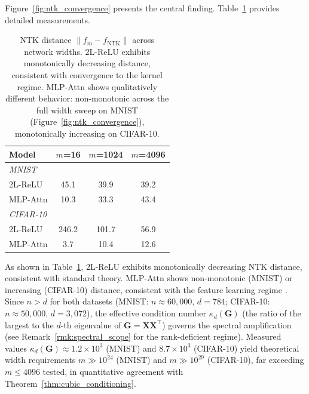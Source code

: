 \documentclass{article}
\theoremstyle{plain}
\theoremstyle{definition}
\theoremstyle{remark}
\begin{document}
Figure~\ref{fig:ntk_convergence} presents the central finding. Table~\ref{tab:ntk_distance} provides detailed measurements.

\begin{table}[t]
\caption{NTK distance $\|f_m - f_{\text{NTK}}\|$ across network widths. 2L-ReLU exhibits monotonically decreasing distance, consistent with convergence to the kernel regime. MLP-Attn shows qualitatively different behavior: non-monotonic across the full width sweep on MNIST (Figure~\ref{fig:ntk_convergence}), monotonically increasing on CIFAR-10.}
\label{tab:ntk_distance}
\vskip 0.1in
\begin{center}
\begin{small}
\begin{tabular}{lccc}
\toprule
\textbf{Model} & \textbf{$m$=16} & \textbf{$m$=1024} & \textbf{$m$=4096} \\
\midrule
\multicolumn{4}{l}{\textit{MNIST}} \\
2L-ReLU & 45.1 & 39.9 & 39.2 \\
MLP-Attn & 10.3 & 33.3 & 43.4 \\
\midrule
\multicolumn{4}{l}{\textit{CIFAR-10}} \\
2L-ReLU & 246.2 & 101.7 & 56.9 \\
MLP-Attn & 3.7 & 10.4 & 12.6 \\
\bottomrule
\end{tabular}
\end{small}
\end{center}
\vskip -0.1in
\end{table}

As shown in Table~\ref{tab:ntk_distance}, 2L-ReLU exhibits monotonically decreasing NTK distance, consistent with standard theory. MLP-Attn shows non-monotonic (MNIST) or increasing (CIFAR-10) distance, consistent with the feature learning regime \citep{chizat2019lazy}. Since $n > d$ for both datasets (MNIST: $n \approx 60{,}000$, $d = 784$; CIFAR-10: $n \approx 50{,}000$, $d = 3{,}072$), the effective condition number $\kappa_d(\mathbf{G})$ (the ratio of the largest to the $d$-th eigenvalue of $\mathbf{G} = \mathbf{X}\mathbf{X}^\top$) governs the spectral amplification (see Remark~\ref{rmk:spectral_scope} for the rank-deficient regime). Measured values $\kappa_d(\mathbf{G}) \approx 1.2 \times 10^3$ (MNIST) and $8.7 \times 10^3$ (CIFAR-10) yield theoretical width requirements $m \gg 10^{24}$ (MNIST) and $m \gg 10^{29}$ (CIFAR-10), far exceeding $m \leq 4096$ tested, in quantitative agreement with Theorem~\ref{thm:cubic_conditioning}.
\end{document}
